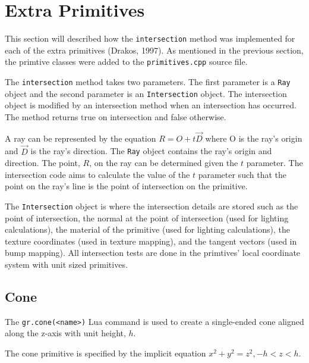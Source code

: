 \section{Extra Primitives}

This section will described how the \verb|intersection| method was
implemented for each of the extra primitives (Drakos, 1997). As mentioned in the 
previous section, the primtive classes were added to the \verb|primitives.cpp| 
source file.

The \verb|intersection| method takes two parameters. The first parameter is a
\verb|Ray| object and the second parameter is an \verb|Intersection| object. The 
intersection object is modified by an intersection method when an intersection 
has occurred. The method returns true on intersection and false otherwise.

A ray can be represented by the equation $R = O + t\vec{D}$ where
O is the ray's origin and $\vec{D}$ is the ray's direction. The \verb|Ray| 
object contains the ray's origin and direction. The point, $R$, on the ray can 
be determined given the $t$ parameter. The intersection code aims to calculate 
the value of the $t$ parameter such that the point on the ray's line is the 
point of intersection on the primitive. 

The \verb|Intersection| object is where the intersection details are
stored such as the point of intersection, the normal at the point of
intersection (used for lighting calculations), the material of the primitive
(used for lighting calculations), the texture coordinates (used in texture
mapping), and the tangent vectors (used in bump mapping). All intersection tests 
are done in the primtives' local coordinate system with unit sized primitives.

\subsection*{Cone}
The \verb|gr.cone(<name>)| Lua command is used to create a single-ended cone 
aligned along the z-axis with unit height, $h$.

The cone primitive is specified by the implicit equation $x^2 + y^2 = z^2, -h <
z < h$.

